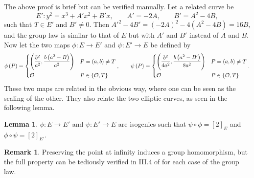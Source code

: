 \documentclass{article}
\newcommand{\rb}[1]{\left( #1 \right)}
\renewcommand{\sb}[1]{\left[ #1 \right]}
\newcommand{\cb}[1]{\left\{ #1 \right\}}
\theoremstyle{definition}\newtheorem*{definition}{Definition}
\theoremstyle{definition}\newtheorem*{example}{Example}
\theoremstyle{definition}\newtheorem*{remark}{Remark}
\newtheorem{lemma}[proposition]{Lemma}
\begin{document}
The above proof is brief but can be verified manually. Let a related curve be
$$ E' : y^2 = x^3 + A'x^2 + B'x, \qquad A' = -2A, \qquad B' = A^2 - 4B, $$
such that $ T \in E' $ and $ B' \ne 0 $. Then $ A'^2 - 4B' = \rb{-2A}^2 - 4\rb{A^2 - 4B} = 16B $, and the group law is similar to that of $ E $ but with $ A' $ and $ B' $ instead of $ A $ and $ B $. Now let the two maps $ \phi : E \to E' $ and $ \psi : E' \to E $ be defined by
$$ \phi\rb{P} = \begin{dcases} \rb{\dfrac{b^2}{a^2}, \dfrac{b\rb{a^2 - B}}{a^2}} & P = \rb{a, b} \ne T \\ \mathcal{O} & P \in \cb{\mathcal{O}, T} \end{dcases}, \qquad \psi\rb{P} = \begin{dcases} \rb{\dfrac{b^2}{4a^2}, \dfrac{b\rb{a^2 - B'}}{8a^2}} & P = \rb{a, b} \ne T \\ \mathcal{O} & P \in \cb{\mathcal{O}, T} \end{dcases}. $$
These two maps are related in the obvious way, where one can be seen as the scaling of the other. They also relate the two elliptic curves, as seen in the following lemma.

\begin{lemma}
$ \phi : E \to E' $ and $ \psi : E' \to E $ are isogenies such that $ \psi \circ \phi = \sb{2}_E $ and $ \phi \circ \psi = \sb{2}_{E'} $.
\end{lemma}

\begin{remark}
Preserving the point at infinity induces a group homomorphism, but the full property can be tediously verified in III.4 of \cite{utm} for each case of the group law.
\end{remark}
\end{document}
